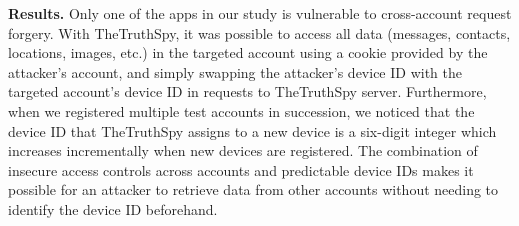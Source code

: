 \documentclass[sigconf,balance=false]{acmart}
\newcommand{\sumanth}[1]{\textcolor{violet}{\noindent[SR: #1]}}
\newcommand{\damon}[1]{\textcolor{blue}{\noindent[DM: #1]}}
\newcommand{\geoff}[1]{\textcolor{purple}{\noindent[GV: #1]}}
\newcommand{\sumanth}[1]{}
\newcommand{\geoff}[1]{}
\newcommand{\damon}[1]{}
\begin{document}
\textbf{Results.}  Only one of the apps in our study is vulnerable to
cross-account request forgery.
With TheTruthSpy, it was possible to
access all data (messages, contacts, locations, images, etc.)  in the
targeted account using a cookie provided by the attacker's account,
and simply swapping the attacker's device ID with the targeted
account's device ID in requests to TheTruthSpy server.  Furthermore,
when we registered multiple test accounts in succession, we noticed
that the device ID that TheTruthSpy assigns to a new device is a six-digit
integer which increases incrementally when new devices are registered.
The combination of insecure access controls across accounts and
predictable device IDs makes it possible for an attacker to retrieve
data from other accounts without needing to identify the device ID
beforehand.



\end{document}
